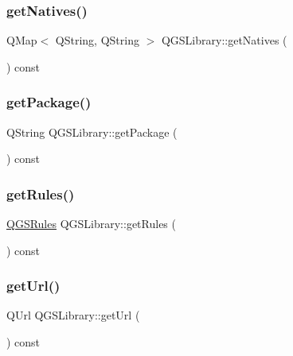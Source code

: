 \mbox{\label{class_q_g_s_library_ab1083f406bcd81a5a979f4f2d722abbd}} 
\subsubsection{\texorpdfstring{get\+Natives()}{getNatives()}}
{\footnotesize\ttfamily Q\+Map$<$ Q\+String, Q\+String $>$ Q\+G\+S\+Library\+::get\+Natives (\begin{DoxyParamCaption}{ }\end{DoxyParamCaption}) const}

\mbox{\label{class_q_g_s_library_ae590d32db993c4491743d72039e2559c}} 
\subsubsection{\texorpdfstring{get\+Package()}{getPackage()}}
{\footnotesize\ttfamily Q\+String Q\+G\+S\+Library\+::get\+Package (\begin{DoxyParamCaption}{ }\end{DoxyParamCaption}) const}

\mbox{\label{class_q_g_s_library_ad72ad2b65c3f42da905f739863d6acbf}} 
\subsubsection{\texorpdfstring{get\+Rules()}{getRules()}}
{\footnotesize\ttfamily \mbox{\hyperlink{class_q_g_s_rules}{Q\+G\+S\+Rules}} Q\+G\+S\+Library\+::get\+Rules (\begin{DoxyParamCaption}{ }\end{DoxyParamCaption}) const}

\mbox{\label{class_q_g_s_library_a0b0836b16d3384c2b1b5cede6915a27b}} 
\subsubsection{\texorpdfstring{get\+Url()}{getUrl()}}
{\footnotesize\ttfamily Q\+Url Q\+G\+S\+Library\+::get\+Url (\begin{DoxyParamCaption}{ }\end{DoxyParamCaption}) const}

